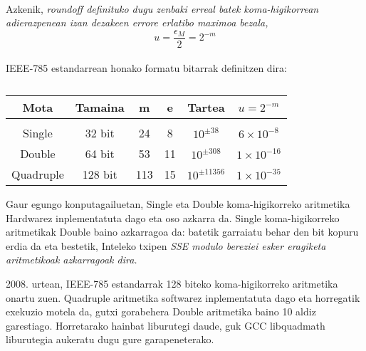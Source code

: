 \paragraph*{}
Azkenik, \it{roundoff} definituko dugu zenbaki erreal batek koma-higikorrean adierazpenean izan dezakeen errore erlatibo maximoa bezala,
\begin{equation*}
u=\frac{\epsilon_M}{2}=2^{-m}
\end{equation*}  


\paragraph*{}IEEE-785 estandarrean honako formatu bitarrak definitzen dira:

\begin{table} [h!]
\caption{}
\label{tab:1}       %
\begin{tabular}{ |c|c|c|c|c|c|} 
\hline
 Mota      &  Tamaina    & m   & e  & Tartea           &  $u=2^{-m}$           \\ \hline
           &             &     &    &                  &                       \\
 Single    & 32 bit      & 24  & 8  & $10^{\pm 38}$    &  $6 \times 10^{-8}$   \\	    
 Double    & 64 bit      & 53  & 11 & $10^{\pm 308}$   &  $1 \times 10^{-16}$   \\
 Quadruple & 128 bit     & 113 & 15 & $10^{\pm 11356}$ &  $1 \times 10^{-35}$   \\
\hline
\end{tabular}
\end{table}

Gaur egungo konputagailuetan, Single eta Double koma-higikorreko aritmetika Hardwarez inplementatuta dago eta oso azkarra da. Single koma-higikorreko aritmetikak Double baino azkarragoa da: batetik garraiatu behar den bit kopuru erdia da eta bestetik, Inteleko txipen \it SSE modulo bereziei esker eragiketa aritmetikoak azkarragoak dira.

2008. urtean, IEEE-785 estandarrak 128 biteko koma-higikorreko aritmetika onartu zuen. Quadruple aritmetika softwarez inplementatuta dago eta horregatik exekuzio motela da, gutxi gorabehera Double aritmetika baino 10 aldiz garestiago. Horretarako hainbat liburutegi daude, guk GCC libquadmath liburutegia aukeratu dugu gure garapeneterako.

